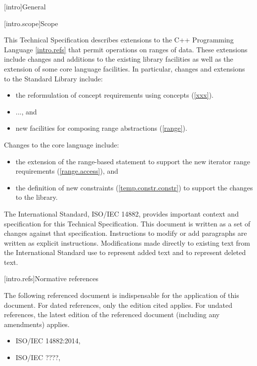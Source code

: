 
[intro]{General}

[intro.scope]{Scope}

\pnum
This Technical Specification describes extensions to the C++
Programming Language \ref{intro.refs} that
permit operations on ranges of data. These extensions include
changes and additions to the existing library facilities as well
as the extension of some core language facilities. In particular,
changes and extensions to the Standard Library include:
\begin{itemize}
\item the reformulation of concept requirements using concepts (\ref{xxx}).
\item ..., and
\item new facilities for composing range abstractions (\ref{range}).
\end{itemize}
%
Changes to the core language include:
\begin{itemize}
\item the extension of the range-based  statement to support
the new iterator range requirements (\ref{range.access}), and
\item the definition of new constraints (\ref{temp.constr.constr}) to
support the changes to the library.
\end{itemize}

\pnum
The International Standard, ISO/IEC 14882, provides important context
and specification for this Technical Specification. This document is
written as a set of changes against that specification. Instructions
to modify or add paragraphs are written as explicit instructions.
Modifications made directly to existing text from the International
Standard use  to represent added text and
 to represent deleted text.


[intro.refs]{Normative references}

\pnum
The following referenced document is indispensable for the
application of this document. For dated references, only the
edition cited applies. For undated references, the latest edition
of the referenced document (including any amendments) applies.

\begin{itemize}
\item ISO/IEC 14882:2014, 
\item ISO/IEC ????, 
\end{itemize}

